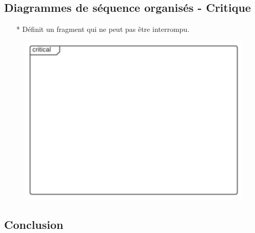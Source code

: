 \documentclass[12pt]{article}
\begin{document}
\subsection{Diagrammes de séquence organisés - Critique}
\begin{itemize}
	\item[*] Définit un fragment qui ne peut pas être interrompu.
\end{itemize}
\newpage
\begin{figure}[!hbtp]
	\centering
	\includegraphics[scale=0.75]{Capture10.PNG}
\end{figure}
\subsection{Conclusion}
\end{document}
